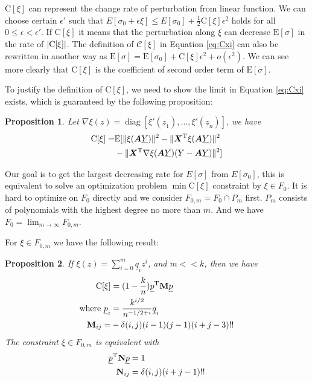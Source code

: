 \documentclass[conference,letterpaper]{IEEEtran}
\newtheorem{proposition}{Proposition}
\DeclarePairedDelimiter\abs{\lvert}{\rvert}
\DeclarePairedDelimiter\norm{\lVert}{\rVert}
\def\E{\mathbb{E}}
\def\T{\mathrm{T}}
\DeclareMathOperator*{\diag}{diag}
\begin{document}
$\mathrm{C}[\xi]$ can represent the change rate of perturbation from linear function. We can choose certain $\epsilon'$ such that $E[\sigma_0 + \epsilon \xi] \leq E[\sigma_0] + \frac{1}{2}\mathrm{C}[\xi]\epsilon^2$ holds for all $0\leq \epsilon < \epsilon'$. If $\mathrm{C}[\xi]$ it means that the perturbation along $\xi$ can decrease $\mathrm{E}[\sigma]$ in the rate of $\abs{\mathrm{C}[\xi]}$.
The definition of $\mathcal{C}[\xi]$ in Equation \eqref{eq:Cxi} can also be rewritten in another way as
$\mathrm{E}[\sigma] = \mathrm{E}[\sigma_0] +
\mathrm{C}[\xi]\epsilon^2 + o(\epsilon^2)$. We can see more clearly that $\mathrm{C}[\xi]$ is the coefficient of second order term of $\mathrm{E}[\sigma]$.

To justify the definition of $\mathrm{C}[\xi]$, we need to show the limit in Equation \eqref{eq:Cxi} exists, which is guaranteed by the following proposition:

\begin{proposition}\label{prop:Esigma} 
Let $\nabla \xi(\underline{z})  = \diag[\xi'(\underline{z}_1), \dots, \xi'(\underline{z}_n)]$, we have
\begin{align}\notag
\mathrm{C}[\xi]= & \E[\norm{\xi(\bm{A}\underline{Y})}^2 -
\norm{\bm{X}^\T\xi(\bm{A}\underline{Y})}^2 \\
&- \norm{\bm{X}^\T \nabla\xi(\bm{A}\underline{Y})(Y-\bm{A}\underline{Y})}^2]
\end{align}
\end{proposition}

Our goal is to get the largest decreasing rate for $E[\sigma]$ from $E[\sigma_0]$, this is equivalent to solve an optimization problem $\min \mathrm{C}[\xi]$ constraint by $\xi \in F_0$. It is hard to optimize on $F_0$ directly and we consider $F_{0,m} = F_0 \cap P_m$ first. $P_m$ consists of polynomials with the highest degree no more than $m$. And we have $F_0 = \lim_{m\to \infty} F_{0,m}$.

For $\xi \in F_{0,m}$ we have the following result:
\begin{proposition}\label{prop:quadratic}
If
$\xi(z) = \sum_{i=0}^m \underline{q}_i z^i$,
and $m << k$, then we have 
\begin{align}
\mathrm{C}[\xi] &= (1-\frac{k}{n}) \underline{p}^\T \mathbf{M} \underline{p} \notag\\
\textrm{where }\underline{p}_i &= \frac{k^{i/2}}{n^{- 1/2 + i}}\underline{q}_i\label{eq:pqt} \\
\mathbf{M}_{ij} =& -\delta(i,j)(i-1)(j-1)(i+j-3)!! \notag
\end{align}
The constraint $\xi \in F_{0,m}$ is equivalent with
\begin{align}
\underline{p}^\T \mathbf{N} \underline{p} & = 1 \notag\\
\mathbf{N}_{ij}  & = \delta(i,j)(i+j-1)!!
\end{align}
\end{proposition}
\end{document}
